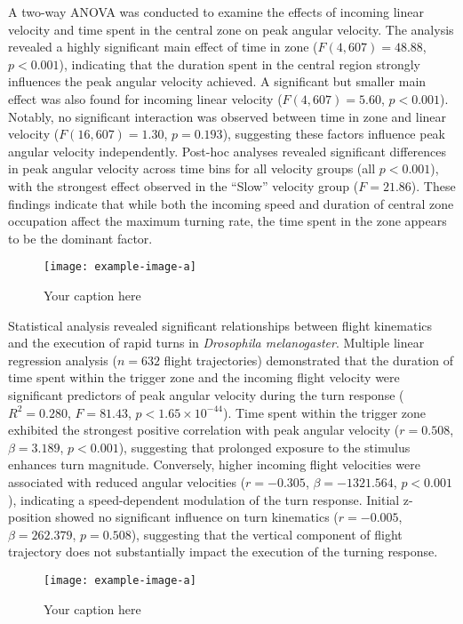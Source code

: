 \documentclass[../main/thesis_msc.tex]{subfiles}
\begin{document}
A two-way ANOVA was conducted to examine the effects of incoming linear velocity and time spent in the central zone on peak angular velocity. The analysis revealed a highly significant main effect of time in zone ($F(4, 607) = 48.88$, $p < 0.001$), indicating that the duration spent in the central region strongly influences the peak angular velocity achieved. A significant but smaller main effect was also found for incoming linear velocity ($F(4, 607) = 5.60$, $p < 0.001$). Notably, no significant interaction was observed between time in zone and linear velocity ($F(16, 607) = 1.30$, $p = 0.193$), suggesting these factors influence peak angular velocity independently. Post-hoc analyses revealed significant differences in peak angular velocity across time bins for all velocity groups (all $p < 0.001$), with the strongest effect observed in the ``Slow'' velocity group ($F = 21.86$). These findings indicate that while both the incoming speed and duration of central zone occupation affect the maximum turning rate, the time spent in the zone appears to be the dominant factor.

\begin{figure}[htbp]
    \centering
    \texttt{[image: example-image-a]}
    \caption{Your caption here}
    \label{fig:your-label}
\end{figure}

Statistical analysis revealed significant relationships between flight kinematics and the execution of rapid turns in \textit{Drosophila melanogaster}. Multiple linear regression analysis ($n = 632$ flight trajectories) demonstrated that the duration of time spent within the trigger zone and the incoming flight velocity were significant predictors of peak angular velocity during the turn response ($R^2 = 0.280$, $F = 81.43$, $p < 1.65 \times 10^{-44}$). Time spent within the trigger zone exhibited the strongest positive correlation with peak angular velocity ($r = 0.508$, $\beta = 3.189$, $p < 0.001$), suggesting that prolonged exposure to the stimulus enhances turn magnitude. Conversely, higher incoming flight velocities were associated with reduced angular velocities ($r = -0.305$, $\beta = -1321.564$, $p < 0.001$), indicating a speed-dependent modulation of the turn response. Initial z-position showed no significant influence on turn kinematics ($r = -0.005$, $\beta = 262.379$, $p = 0.508$), suggesting that the vertical component of flight trajectory does not substantially impact the execution of the turning response.

\begin{figure}[htbp]
    \centering
    \texttt{[image: example-image-a]}
    \caption{Your caption here}
    \label{fig:your-label}
\end{figure}
\end{document}
